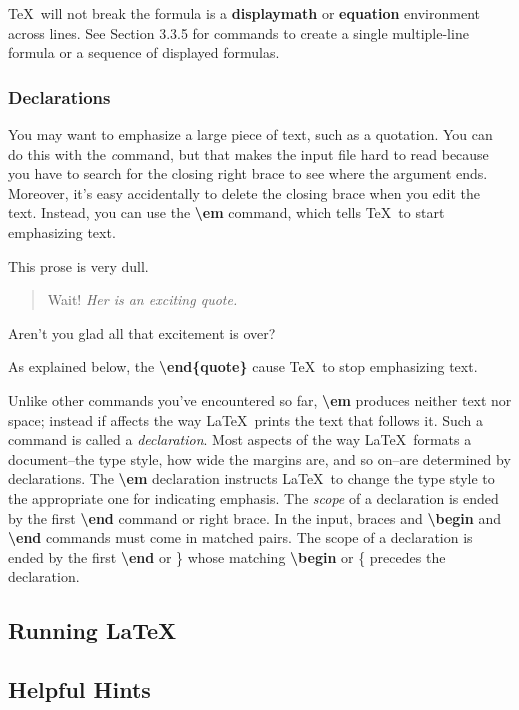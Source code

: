 \documentclass[twocolumn]{article}        %
\begin{document}
\TeX\ will not break the formula is a \textbf{displaymath} or \textbf{equation} environment across lines.
See Section 3.3.5 for commands to create a single multiple-line formula or a sequence of displayed formulas.

\subsubsection{Declarations}

You may want to emphasize a large piece of text, such as a quotation. You can do this with the \emph command, 
but that makes the input file hard to read because you have to search for the closing right brace to see where 
the argument ends. Moreover, it's easy accidentally to delete the closing brace when you edit the text. Instead, 
you can use the \textbf{\textbackslash em} command, which tells \TeX\ to start emphasizing text.

\hfill \break \noindent
This prose is very dull.
\begin{quote}
Wait! \em Her is an exciting quote.
\end{quote}
Aren't you glad all that excitement is over?

\hfill \break \noindent
As explained below, the \textbf{\textbackslash end\{quote\}} cause \TeX\ to stop emphasizing text.

Unlike other commands you've encountered so far, \textbf{\textbackslash em} produces neither text nor space;
instead if affects the way \LaTeX\ prints the text that follows it. Such a command is called a 
\emph{declaration}. Most aspects of the way \LaTeX\ formats a document--the type style, how wide the margins are,
and so on--are determined by declarations.
The \textbf{\textbackslash em} declaration instructs \LaTeX\ to change the type style to the appropriate one 
for indicating emphasis.
The \emph{scope} of a declaration is ended by the first \textbf{\textbackslash end} command or right brace.
In the input, braces and \textbf{\textbackslash begin} and \textbf{\textbackslash end} commands must come in
matched pairs. The scope of a declaration is ended by the first \textbf{\textbackslash end} or \} whose matching 
\textbf{\textbackslash begin} or \{ precedes the declaration.

\subsection{Running \LaTeX\ }

\subsection{Helpful Hints}
\end{document}
